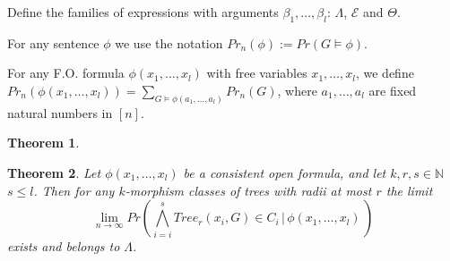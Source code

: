 \documentclass[11pt,notitlepage]{report}
\newtheorem{theorem}{Theorem}[chapter]
\theoremstyle{definition}
\newcommand{\N}{\mathbb{N}}
\newcommand{\Ln}{\lim\limits_{n\to \infty}}
\begin{document}
Define the families of expressions with arguments $\beta_1,\dots, \beta_l$: 
$\Lambda$, $\mathcal{E}$ and $\Theta$. \par
For any sentence $\phi$ we use the notation 
$Pr_n(\phi):=Pr(G\models \phi)$. \par
For any F.O. formula $\phi(x_1,\dots,x_l)$ with free variables 
$x_1, \dots, x_l$, we define $Pr_n(\phi(x_1,\dots,x_l))=
\sum_{G\models \phi(a_1,\dots,a_l)} Pr_n(G) $, 
where $a_1, \dots, a_l$ are fixed natural numbers in $[n]$.



\begin{theorem}
	
\end{theorem}

\begin{theorem} 
	Let $\phi(x_1,\dots, x_l)$ be a consistent open formula, and let $k,r,s\in \N$ $s\leq l$. Then for any $k$-morphism classes of trees with radii
	at most $r$ the limit
	\[ \Ln Pr(\bigwedge_{i=i}^s Tree_r(x_i,G)\in C_i \, | \, \phi(x_1,\dots, x_l) \,)\]
	exists and belongs to $\Lambda$.	
\end{theorem}


 





\end{document}
